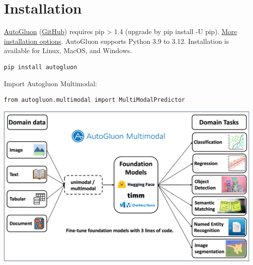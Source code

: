 


\section*{Installation}
\href{https://auto.gluon.ai/stable/index.html}{AutoGluon} (\href{https://github.com/awslabs/autogluon/}{GitHub}) requires pip > 1.4 (upgrade by pip install -U pip). \href{https://auto.gluon.ai/stable/index.html#installation}{More installation options}. AutoGluon supports Python 3.9 to 3.12. Installation is available for Linux, MacOS, and Windows.

\begin{verbatim}
pip install autogluon
\end{verbatim}

Import Autogluon Multimodal:

\begin{verbatim}
from autogluon.multimodal import MultiModalPredictor
\end{verbatim}

\begin{center}
\includegraphics[width=1.0\linewidth]{images/automm-intro.png}
\end{center}



